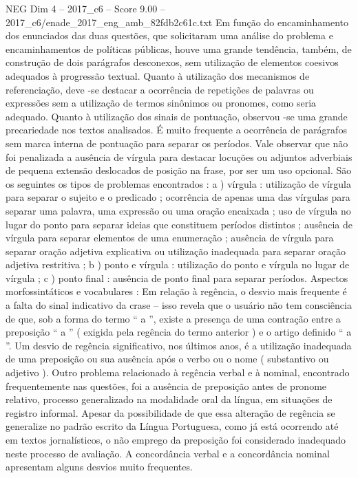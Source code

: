 \begin{textsample}{NEG Dim 4 – 2017\_c6 – Score 9.00 – 2017\_c6/enade\_2017\_eng\_amb\_82fdb2c61c.txt}
Em função do encaminhamento dos enunciados das duas questões, que solicitaram uma análise do problema e encaminhamentos de políticas públicas, houve uma grande tendência, também, de construção de dois parágrafos desconexos, sem utilização de elementos coesivos adequados à progressão textual.
Quanto à utilização dos mecanismos de referenciação, deve -se destacar a ocorrência de repetições de palavras ou expressões sem a utilização de termos sinônimos ou pronomes, como seria adequado.
Quanto à utilização dos sinais de pontuação, observou -se uma grande precariedade nos textos analisados.
É muito frequente a ocorrência de parágrafos sem marca interna de pontuação para separar os períodos.
Vale observar que não foi penalizada a ausência de vírgula para destacar locuções ou adjuntos adverbiais de pequena extensão deslocados de posição na frase, por ser um uso opcional.
São os seguintes os tipos de problemas encontrados : a ) vírgula : utilização de vírgula para separar o sujeito e o predicado ; ocorrência de apenas uma das vírgulas para separar uma palavra, uma expressão ou uma oração encaixada ; uso de vírgula no lugar do ponto para separar ideias que constituem períodos distintos ; ausência de vírgula para separar elementos de uma enumeração ; ausência de vírgula para separar oração adjetiva explicativa ou utilização inadequada para separar oração adjetiva restritiva ; b ) ponto e vírgula : utilização do ponto e vírgula no lugar de vírgula ; c ) ponto final : ausência de ponto final para separar períodos.
Aspectos morfossintáticos e vocabulares : Em relação à regência, o desvio mais frequente é a falta do sinal indicativo da crase – isso revela que o usuário não tem consciência de que, sob a forma do termo “ a ”, existe a presença de uma contração entre a preposição “ a ” ( exigida pela regência do termo anterior ) e o artigo definido “ a ”.
Um desvio de regência significativo, nos últimos anos, é a utilização inadequada de uma preposição ou sua ausência após o verbo ou o nome ( substantivo ou adjetivo ).
Outro problema relacionado à regência verbal e à nominal, encontrado frequentemente nas questões, foi a ausência de preposição antes de pronome relativo, processo generalizado na modalidade oral da língua, em situações de registro informal.
Apesar da possibilidade de que essa alteração de regência se generalize no padrão escrito da Língua Portuguesa, como já está ocorrendo até em textos jornalísticos, o não emprego da preposição foi considerado inadequado neste processo de avaliação.
A concordância verbal e a concordância nominal apresentam alguns desvios muito frequentes.

\end{textsample}
